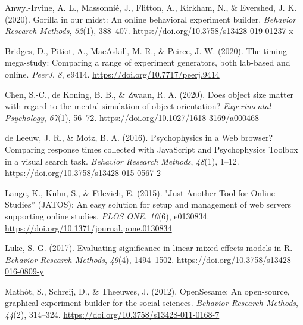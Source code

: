 \documentclass[
  man,floatsintext]{apa6}
\newlength{\cslhangindent}
\newlength{\cslentryspacingunit} %
\newenvironment{CSLReferences}[2] %
 {%
  \setlength{\parindent}{0pt}
  \ifodd #1
  \let\oldpar\par
  \def\par{\hangindent=\cslhangindent\oldpar}
  \fi
  \setlength{\parskip}{#2\cslentryspacingunit}
 }%
 {}
\begin{document}
\hypertarget{refs}{}
\begin{CSLReferences}{1}{0}
\leavevmode{}%
Anwyl-Irvine, A. L., Massonnié, J., Flitton, A., Kirkham, N., \& Evershed, J. K. (2020). Gorilla in our midst: {An} online behavioral experiment builder. \emph{Behavior Research Methods}, \emph{52}(1), 388--407. \url{https://doi.org/10.3758/s13428-019-01237-x}

\leavevmode{}%
Bridges, D., Pitiot, A., MacAskill, M. R., \& Peirce, J. W. (2020). The timing mega-study: Comparing a range of experiment generators, both lab-based and online. \emph{PeerJ}, \emph{8}, e9414. \url{https://doi.org/10.7717/peerj.9414}

\leavevmode{}%
Chen, S.-C., de Koning, B. B., \& Zwaan, R. A. (2020). Does object size matter with regard to the mental simulation of object orientation? \emph{Experimental Psychology}, \emph{67}(1), 56--72. \url{https://doi.org/10.1027/1618-3169/a000468}

\leavevmode{}%
de Leeuw, J. R., \& Motz, B. A. (2016). Psychophysics in a {Web} browser? {Comparing} response times collected with {JavaScript} and {Psychophysics Toolbox} in a visual search task. \emph{Behavior Research Methods}, \emph{48}(1), 1--12. \url{https://doi.org/10.3758/s13428-015-0567-2}

\leavevmode{}%
Lange, K., Kühn, S., \& Filevich, E. (2015). "{Just Another Tool} for {Online Studies}'' ({JATOS}): {An} easy solution for setup and management of web servers supporting online studies. \emph{PLOS ONE}, \emph{10}(6), e0130834. \url{https://doi.org/10.1371/journal.pone.0130834}

\leavevmode{}%
Luke, S. G. (2017). Evaluating significance in linear mixed-effects models in {R}. \emph{Behavior Research Methods}, \emph{49}(4), 1494--1502. \url{https://doi.org/10.3758/s13428-016-0809-y}

\leavevmode{}%
Mathôt, S., Schreij, D., \& Theeuwes, J. (2012). {OpenSesame}: {An} open-source, graphical experiment builder for the social sciences. \emph{Behavior Research Methods}, \emph{44}(2), 314--324. \url{https://doi.org/10.3758/s13428-011-0168-7}


\end{CSLReferences}
\end{document}
